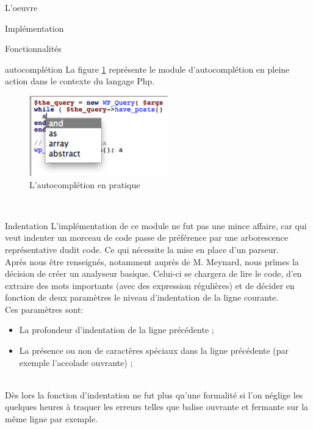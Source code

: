 \documentclass[a4paper, 12pt]{report}
\begin{document}
\begin{part}{L'oeuvre}
\begin{chapter}{Implémentation}
\begin{section}{Fonctionnalités}
\begin{subsection}{\Gls{autocomplétion}}
					La figure \ref{tabouret} représente le module d'\gls{autocomplétion} en pleine action dans le contexte du langage \gls{Php}.

					\begin{figure}[h]
						\begin{center}
							\includegraphics[width=6cm]{images/screenAutocmpl.png}
							\caption{L'autocomplétion en pratique}
							\label{tabouret}
						\end{center}
					\end{figure}~\\
				\end{subsection}
				\begin{subsection}{Indentation}
					L'implémentation de ce module ne fut pas une mince affaire, car qui veut indenter un morceau de code passe 
					de préférence par une arborescence représentative dudit code. Ce qui nécessite la mise en place d'un \gls{parseur}.\\
					Après nous être renseignés, notamment auprès de M. Meynard, nous prîmes la décision de créer un analyseur basique. 
					Celui-ci se chargera de lire le code, d'en extraire des mots importants (avec des \glspl{expression régulière})
					et de décider en fonction de deux paramètres le niveau d'indentation de la ligne courante.\\
					Ces paramètres sont:
					\begin{itemize}
						\item La profondeur d'indentation de la ligne précédente ;
						\item La présence ou non de caractères spéciaux dans la ligne précédente (par exemple l'accolade ouvrante) ;
					\end{itemize}~\\

					Dès lors la fonction d'indentation ne fut plus qu'une formalité si l'on néglige les quelques heures à traquer les erreurs
					telles que balise ouvrante et fermante sur la même ligne par exemple.


\end{subsection}
\end{section}
\end{chapter}
\end{part}
\end{document}
